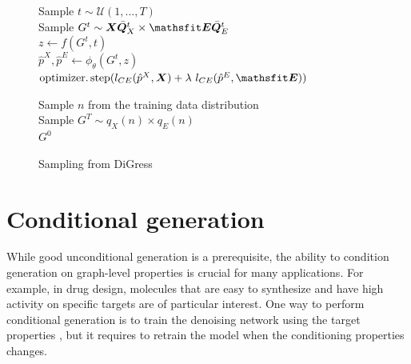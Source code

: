 \documentclass{article} %
\theoremstyle{plain}
\theoremstyle{definition}
\theoremstyle{remark}
\begin{document}
\begin{figure}[t]
\begin{algorithm}[H]
\caption{Training DiGress} \label{alg:trainingDiGress}
Sample $t \sim \mathcal U(1, ..., T)$  \\
Sample $G^t \sim \mX \bar \mQ^t_X \times \tE \bar \mQ^t_E$  \\
$z \gets  f(G^t, t)$  \\
$\hat p^X, \hat p^E \gets \phi_\theta(G^t, z)$ 
 \\

$\operatorname{optimizer.step}(l_{CE}(\hat p^X, \mX) + \lambda ~ l_{CE}(\hat p^E, \tE))$ \\

\end{algorithm}\vspace{-0.10cm}
\begin{algorithm}[H]
\caption{Sampling from DiGress}\label{alg:SamplingDigress}
Sample $n$ from the training data distribution \\
Sample $G^T  \sim q_X(n) \times q_E(n)$ \\
\Return $G^0$
\end{algorithm}
\vspace{-0.4cm}
\end{figure}

\section{Conditional generation}

While good unconditional generation is a prerequisite,
the ability to condition generation on graph-level properties is crucial for many applications. For example, in drug design, molecules that are easy to synthesize and have high activity on specific targets are of particular interest. One way to perform conditional generation is to train the denoising network using the target properties \citep{hoogeboom2022equivariant}, but it requires to retrain the model when the conditioning properties changes.
\end{document}
